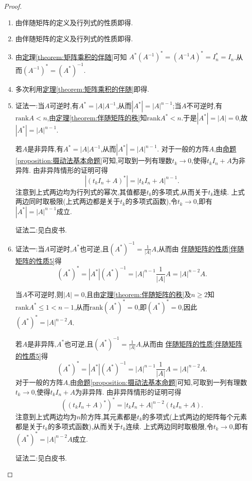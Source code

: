 \documentclass[../../main.tex]{subfiles}
\begin{document}
\begin{proof}
\begin{enumerate}
\item 由伴随矩阵的定义及行列式的性质即得.

\item 由伴随矩阵的定义及行列式的性质即得.

\item 由\hyperref[theorem:矩阵乘积的伴随]{定理\ref{theorem:矩阵乘积的伴随}}可知
$A^*\left( A^{-1} \right) ^*=\left( A^{-1}A \right) ^*=I_{n}^{*}=I_n$.从而$(A^{-1})^* = (A^*)^{-1}$.

\item 多次利用\hyperref[theorem:矩阵乘积的伴随]{定理\ref{theorem:矩阵乘积的伴随}}即得.

\item 
{\color{blue}证法一:}当\(A\)可逆时,有\(A^* = |A|A^{-1}\),从而\(|A^*| = |A|^{n - 1}\);当\(A\)不可逆时,有$\mathrm{rank}A<n$,由\hyperref[theorem:伴随矩阵的秩]{定理\ref{theorem:伴随矩阵的秩}}知$\mathrm{rank}A^*<n$.于是\(|A^*| = |A| = 0\),故\(|A^*| = |A|^{n - 1}\).

若\(A\)是非异阵,有\(A^* = |A|A^{-1}\),从而\(|A^*| = |A|^{n - 1}\). 对于一般的方阵\(A\),由\hyperref[proposition:摄动法基本命题]{命题\ref{proposition:摄动法基本命题}}可知,可取到一列有理数\(t_k\rightarrow0\),使得\(t_kI_n + A\)为非异阵. 由非异阵情形的证明可得
\[
|(t_kI_n + A)^*| = |t_kI_n + A|^{n - 1}.
\]
注意到上式两边均为行列式的幂次,其值都是\(t_k\)的多项式,从而关于\(t_k\)连续. 上式两边同时取极限(上式两边都是关于$t_k$的多项式函数),令\(t_k\rightarrow0\),即有\(|A^*| = |A|^{n - 1}\)成立.

{\color{blue}证法二:}见白皮书.

\item {\color{blue}证法一:}当\(A\)可逆时,\(A^*\)也可逆,且\((A^*)^{-1} = \frac{1}{|A|}A\),从而由 \hyperref[伴随矩阵的性质5]{伴随矩阵的性质\ref{伴随矩阵的性质5}}得
\[
(A^*)^* = |A^*|(A^*)^{-1} = |A|^{n - 1}\frac{1}{|A|}A = |A|^{n - 2}A.
\]

当\(A\)不可逆时,则\(|A| = 0\),且由\hyperref[theorem:伴随矩阵的秩]{定理\ref{theorem:伴随矩阵的秩}}及$n\geq 2$知\(\mathrm{rank}A^* \leq 1<n-1\),从而\(\mathrm{rank}(A^*)^* = 0\),即\((A^*)^* = 0\),因此\((A^*)^* = |A|^{n - 2}A\).

若\(A\)是非异阵,\(A^*\)也可逆,且\((A^*)^{-1} = \frac{1}{|A|}A\),从而由 \hyperref[伴随矩阵的性质5]{伴随矩阵的性质\ref{伴随矩阵的性质5}}得
\[
(A^*)^* = |A^*|(A^*)^{-1} = |A|^{n - 1}\frac{1}{|A|}A = |A|^{n - 2}A.
\]
对于一般的方阵\(A\),由\hyperref[proposition:摄动法基本命题]{命题\ref{proposition:摄动法基本命题}}可知,可取到一列有理数\(t_k\rightarrow0\),使得\(t_kI_n + A\)为非异阵. 由非异阵情形的证明可得
\[
((t_kI_n + A)^*)^* = |t_kI_n + A|^{n - 2}(t_kI_n + A).
\]
注意到上式两边均为\(n\)阶方阵,其元素都是\(t_k\)的多项式(上式两边的矩阵每个元素都是关于$t_k$的多项式函数),从而关于\(t_k\)连续. 上式两边同时取极限,令\(t_k\rightarrow0\),即有\((A^*)^* = |A|^{n - 2}A\)成立. 

{\color{blue}证法二:}见白皮书.
\end{enumerate}
\end{proof}
\end{document}
